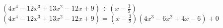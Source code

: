 {$\left(4x^4-12x^3+13x^2 -12x+9\right) \div \left(x - \frac{3}{2} \right)$}
{$\left(4x^4-12x^3+13x^2 -12x+9\right) = \left(x - \frac{3}{2} \right) \left(4x^3-6x^2+4x-6 \right)+0$}